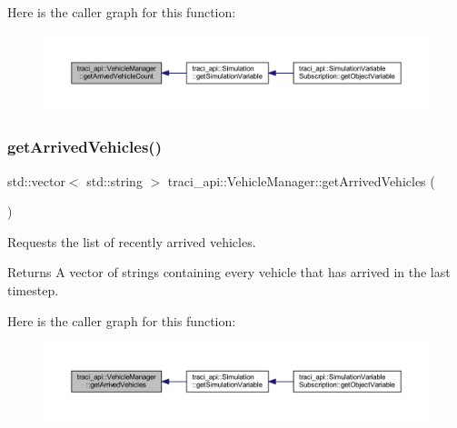 Here is the caller graph for this function\+:\nopagebreak
\begin{figure}[H]
\begin{center}
\leavevmode
\includegraphics[width=350pt]{classtraci__api_1_1_vehicle_manager_a193c8fa0b8778c496b23fc114653ebfa_icgraph}
\end{center}
\end{figure}
\mbox{\label{classtraci__api_1_1_vehicle_manager_a5ae11ca161f1e9635142a1cdd40417ca}} 
\subsubsection{\texorpdfstring{get\+Arrived\+Vehicles()}{getArrivedVehicles()}}
{\footnotesize\ttfamily std\+::vector$<$ std\+::string $>$ traci\+\_\+api\+::\+Vehicle\+Manager\+::get\+Arrived\+Vehicles (\begin{DoxyParamCaption}{ }\end{DoxyParamCaption})}



Requests the list of recently arrived vehicles. 

\begin{DoxyReturn}{Returns}
A vector of strings containing every vehicle that has arrived in the last timestep. 
\end{DoxyReturn}
Here is the caller graph for this function\+:\nopagebreak
\begin{figure}[H]
\begin{center}
\leavevmode
\includegraphics[width=350pt]{classtraci__api_1_1_vehicle_manager_a5ae11ca161f1e9635142a1cdd40417ca_icgraph}
\end{center}
\end{figure}
\mbox{\label{classtraci__api_1_1_vehicle_manager_a707b94f1d1f82a35263ae130a0573f77}} 
